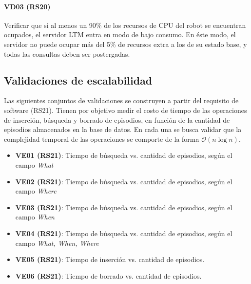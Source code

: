 \paragraph{VD03 (RS20)}
Verificar que si al menos un 90\% de los recursos de CPU del robot se encuentran ocupados, el servidor LTM entra en modo de bajo consumo. En éste modo, el servidor no puede ocupar más del 5\% de recursos extra a los de su estado base, y todas las consultas deben ser postergadas.


\subsection{Validaciones de escalabilidad}

Las siguientes conjuntos de validaciones se construyen a partir del requisito de software (RS21). Tienen por objetivo medir el costo de tiempo de las operaciones de inserción, búsqueda y borrado de episodios, en función de la cantidad de episodios almacenados en la base de datos. En cada una se busca validar que la complejidad temporal de las operaciones se comporte de la forma $\mathcal{O}(n\log{}n)$.



\begin{itemize}
\item {\bf VE01 (RS21)}: Tiempo de búsqueda vs. cantidad de episodios, según el campo \textit{What}
\item {\bf VE02 (RS21)}: Tiempo de búsqueda vs. cantidad de episodios, según el campo \textit{Where}
\item {\bf VE03 (RS21)}: Tiempo de búsqueda vs. cantidad de episodios, según el campo \textit{When}
\item {\bf VE04 (RS21)}: Tiempo de búsqueda vs. cantidad de episodios, según el campo \textit{What, When, Where}
\item {\bf VE05 (RS21)}: Tiempo de inserción vs. cantidad de episodios.
\item {\bf VE06 (RS21)}: Tiempo de borrado vs. cantidad de episodios.
\end{itemize}

